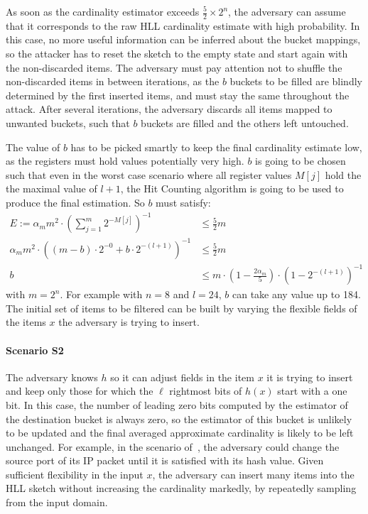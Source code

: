 \documentclass[11pt]{article}
\begin{document}
As soon as the cardinality estimator exceeds $\frac{5}{2}\times 2^n$, the adversary can assume that it corresponds to the raw HLL cardinality estimate with high probability. In this case, no more useful information can be inferred about the bucket mappings, so the attacker has to reset the sketch to the empty state and start again with the non-discarded items. The adversary must pay attention not to shuffle the non-discarded items in between iterations, as the $b$ buckets to be filled are blindly determined by the first inserted items, and must stay the same throughout the attack. After several iterations, the adversary discards all items mapped to unwanted buckets, such that $b$ buckets are filled and the others left untouched.

The value of $b$ has to be picked smartly to keep the final cardinality estimate low, as the registers must hold values potentially very high. $b$ is going to be chosen such that even in the worst case scenario where all register values $M[j]$ hold the the maximal value of $l+1$, the Hit Counting algorithm is going to be used to produce the final estimation. So $b$ must satisfy:
\begin{align}
E:=\alpha_mm^2\cdot(\sum_{j=1}^m2^{-M[j]})^{-1} & \le \frac{5}{2}m \nonumber\\
\alpha_mm^2\cdot((m-b)\cdot2^{-0}+b\cdot2^{-(l+1)})^{-1} & \le \frac{5}{2}m \nonumber\\
b & \le m\cdot(1-\frac{2\alpha_m}{5})\cdot(1-2^{-(l+1)})^{-1} \label{eqn:1} 
\end{align}
with $m=2^n$. For example with $n = 8$ and $l = 24$, $b$ can take any value up to 184. The initial set of items to be filtered can be built by varying the flexible fields of the items $x$ the adversary is trying to insert.

\noindent\paragraph{Scenario S2} The adversary knows $h$ so it can adjust fields in the item $x$ it is trying to insert and keep only those for which the $\ell$ rightmost bits of $h(x)$ start with a one bit. In this case, the number of leading zero bits computed by the estimator of the destination bucket is always zero, so the estimator of this bucket is unlikely to be updated and the final averaged approximate cardinality is likely to be left unchanged.
For example, in the scenario of~\cite{portscanhll}, the adversary could change the source port of its IP packet until it is satisfied with its hash value. Given sufficient flexibility in the input $x$, the adversary can insert many items into the HLL sketch without increasing the cardinality markedly, by repeatedly sampling from the input domain.
\end{document}
